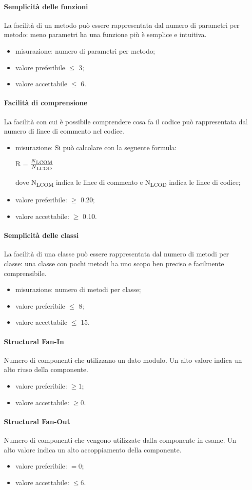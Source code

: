 \paragraph{Semplicità delle funzioni}
La facilità di un metodo può essere rappresentata dal numero di parametri per metodo: meno parametri ha una funzione più è semplice e intuitiva.
	\begin{itemize}
		\item misurazione: numero di parametri per metodo;
		\item valore preferibile $\leq$ 3;
		\item valore accettabile $\leq$ 6.
	\end{itemize}

\paragraph{Facilità di comprensione}
La facilità con cui è possibile comprendere cosa fa il codice può rappresentata dal numero di linee di commento nel codice.
	\begin{itemize}
	    \item misurazione: Si può calcolare con la seguente formula: \\
		\centerline{R = \(\frac{N\textsubscript{LCOM}}{N\textsubscript{LCOD}} \) }
			dove N\textsubscript{LCOM} indica le linee di commento e N\textsubscript{LCOD} indica le linee di codice;
		\item valore preferibile: $\geq$ 0.20;
		\item valore accettabile: $\geq$ 0.10.
	\end{itemize}

\paragraph{Semplicità delle classi}
La facilità di una classe può essere rappresentata dal numero di metodi per classe: una classe con pochi metodi ha uno scopo ben preciso e facilmente comprensibile.
	\begin{itemize}
		\item misurazione: numero di metodi per classe;
		\item valore preferibile $\leq$ 8;
		\item valore accettabile $\leq$ 15.
	\end{itemize}

\paragraph{Structural Fan-In}
Numero di componenti che utilizzano un dato modulo. Un alto valore indica un alto riuso della
componente.
    \begin{itemize}
         \item valore preferibile: $\geq 1$;
        \item valore accettabile: $\geq 0$.
     \end{itemize}
\paragraph{Structural Fan-Out}
Numero di componenti che vengono utilizzate dalla componente in esame. Un alto valore indica
un alto accoppiamento della componente.
    \begin{itemize}
        \item valore preferibile: $=0$;
        \item valore accettabile: $\leq 6$.
	\end{itemize}
    
